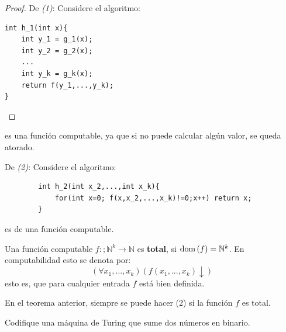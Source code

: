 \documentclass[12pt]{report}
\newcounter{it}
\theoremstyle{largebreak}
\newcommand\cf[3]{\ensuremath{#1:#2\rightarrow#3}}
\newcommand{\dom}[1]{\textup{dom}\left(#1 \right)}
\begin{document}
    \begin{proof}
        De \textit{(1)}: Considere el algoritmo:
        \begin{lstlisting}
int h_1(int x){
    int y_1 = g_1(x);
    int y_2 = g_2(x);
    ...
    int y_k = g_k(x);
    return f(y_1,...,y_k);
}
        \end{lstlisting}
    \end{proof}
    es una función computable, ya que si no puede calcular algún valor, se queda atorado.

    De \textit{(2)}: Considere el algoritmo:
    \begin{lstlisting}
        int h_2(int x_2,...,int x_k){
            for(int x=0; f(x,x_2,...,x_k)!=0;x++) return x;
        }
    \end{lstlisting}
    es de una función computable.

    \begin{mydef}
        Una función computable $\cf{f}{;\mathbb{N}^k}{\mathbb{N}}$ es \textbf{total}, si $\dom{f}=\mathbb{N}^k$. En computabilidad esto se denota por:
        \begin{equation*}
            (\forall x_1,...,x_k)(f(x_1,...,x_k)\downarrow)
        \end{equation*}
        esto es, que para cualquier entrada $f$ está bien definida.
    \end{mydef}

    \begin{obs}
        En el teorema anterior, siempre se puede hacer (2) si la función $f$ es total.
    \end{obs}

    \begin{excer}
        Codifique una máquina de Turing que sume dos números en binario.
    \end{excer}
\end{document}
